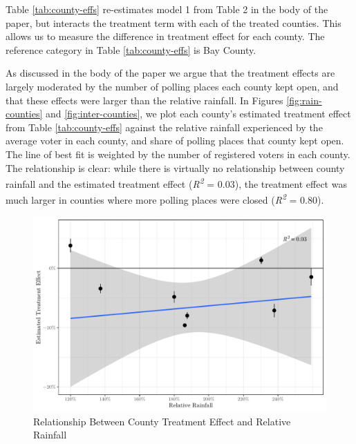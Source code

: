 \documentclass[
  12pt,
]{article}
\begin{document}
Table \ref{tab:county-effs} re-estimates model 1 from Table 2 in the body of the paper, but interacts the treatment term with each of the treated counties. This allows us to measure the difference in treatment effect for each county. The reference category in Table \ref{tab:county-effs} is Bay County.

\begin{singlespace}

\end{singlespace}

As discussed in the body of the paper we argue that the treatment effects are largely moderated by the number of polling places each county kept open, and that these effects were larger than the relative rainfall. In Figures \ref{fig:rain-counties} and \ref{fig:inter-counties}, we plot each county's estimated treatment effect from Table \ref{tab:county-effs} against the relative rainfall experienced by the average voter in each county, and share of polling places that county kept open. The line of best fit is weighted by the number of registered voters in each county. The relationship is clear: while there is virtually no relationship between county rainfall and the estimated treatment effect (\emph{R\textsuperscript{2}} = 0.03), the treatment effect was much larger in counties where more polling places were closed (\emph{R\textsuperscript{2}} = 0.80).

\begin{figure}[H]

{\centering \includegraphics{si_files/figure-latex/rain-chunk-1} 

}

\caption{\label{fig:rain-counties}Relationship Between County Treatment Effect and Relative Rainfall}\label{fig:rain-chunk}
\end{figure}
\end{document}
